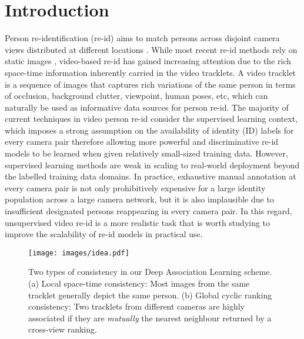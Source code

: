 \documentclass{bmvc2k}
\begin{document}
\section{Introduction}
\label{sec:intro}
Person re-identification (re-id) aims to match persons 
across disjoint camera views distributed at different locations 
\cite{gong2014person}.
While most recent re-id methods rely on static images
\cite{li2014deepreid,ahmed2015improved,xiao2016learning,wang2016joint,li2017person,sun2017svdnet,zheng2017unlabeled,chen2017person,li2018harmonious,zhong2017camera,wang2018person,zhu2017fast},
video-based re-id has gained increasing attention
\cite{hirzer2011person,wang2014person,wang2016person,zhu2016video,zheng2016mars,you2016top,mclaughlin2016recurrent,yan2016person,zheng2016mars,zhou2017see,xu2017jointly}
due to the rich space-time information inherently carried in the video tracklets. 
A video tracklet is a sequence of images that
captures rich variations of the same person 
in terms of occlusion, background clutter, viewpoint, human poses, etc, 
which can naturally be used as informative data sources for person re-id.
The majority of current techniques in video person re-id consider the supervised 
learning context, which 
imposes a strong assumption on the availability of identity (ID) labels for
every camera pair 
therefore allowing more powerful and discriminative re-id models to be learned 
when given relatively small-sized training data. However, supervised learning methods are weak in scaling to real-world deployment beyond the labelled training data domains. 
In practice, exhaustive manual annotation at every camera pair 
is not only prohibitively expensive for a large identity population across a large camera network, 
but it is also implausible due to insufficient designated persons reappearing in every camera pair. 
In this regard, unsupervised video re-id is a more realistic task 
that is worth studying to improve the scalability of re-id models in practical use.


\begin{figure}[!t]
\centering
\texttt{[image: images/idea.pdf]}
\vspace{1.0em}
\caption{
Two types of consistency in our Deep Association Learning scheme. 
(a) Local space-time consistency: Most images from the same
tracklet generally depict the same person. 
(b) Global cyclic ranking consistency: Two tracklets from different
cameras are highly associated if they are {\em mutually} the nearest
neighbour returned by a cross-view ranking. }
\label{fig:idea}
\vspace{-0.5em}
\end{figure}
\end{document}
